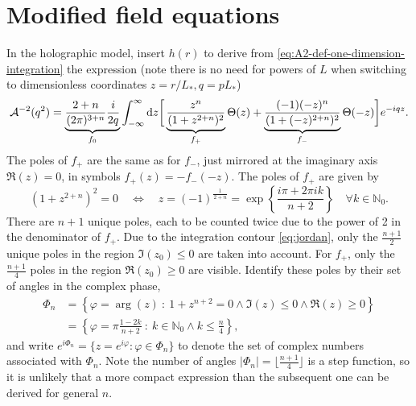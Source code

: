 \documentclass[12pt,a4paper]{report}
\numberwithin{equation}{chapter}
\begin{document}
\section{Modified field equations}\label{sec:modified-einstein}
In the holographic model, insert $h(r)$ to derive from \eqref{eq:A2-def-one-dimension-integration} the expression (note there is no need for powers of $L$ when switching to dimensionless coordinates $z=r/L_*,q=pL_*$)
\begin{equation}\label{eq:A2-holo-def}
{\cal A}^{-2}(q^2) =
\underbrace{\frac{2+n}{(2\pi)^{3+n}} \frac{i}{2q}}_{f_0}
\int_{-\infty}^\infty
\mathrm{d} z
\bigg[
\underbrace{\frac{z^n}{(1+z^{2+n})^2}}_{f_+} \Theta(z)
+
\underbrace{\frac{(-1)(-z)^n}{(1 + (-z)^{2+n})^2}}_{f_-} \Theta(-z)
\bigg]
e^{-i q z}.
\end{equation}
The poles of $f_+$ are the same as for $f_-$, just mirrored at the
imaginary axis $\Re(z)=0$, in symbols $f_+(z)=-f_-(-z)$. The poles of $f_+$ are given by
\begin{equation}
\left( 1 + z^{2+n} \right)^2 = 0
\quad\Leftrightarrow\quad
z = (-1)^{\frac 1{2+n}}
= \exp \left\{ \frac{i\pi + 2\pi ik}{n+2} \right\}
\quad\forall k\in \mathbb{N}_0.
\end{equation}
There are $n+1$ unique poles, each to be counted twice due to the power of 2 in the denominator of $f_+$.
Due to the integration contour \eqref{eq:jordan}, only the $\frac{n+1}{2}$ unique poles in the region
$\Im(z_0)\leq 0$ are taken into account. For $f_+$, only the $\frac{n+1}{4}$ poles in the region $\Re(z_0) \geq 0$ are
visible. Identify these poles by their set of angles in the complex phase,
\begin{align}
\Phi_n &= \left\{ \varphi=\arg(z)~:~1 + z^{n+2}=0 \wedge \Im(z) \leq 0 \wedge \Re(z) \geq 0 \right\}
\\
\label{eq:Phi}
&= \left\{ \varphi=\pi \frac{1 - 2k}{n+2}~:~k \in \mathbb{N}_0 \wedge k \leq \frac{n}{4}  \right\},
\end{align}
and write $e^{i\Phi_n}=\{ z = e^{i\varphi} : \varphi \in \Phi_n\}$ to denote the set of
complex numbers associated with $\Phi_n$.
Note the number of angles $|\Phi_n|=\lfloor \frac{n+1}{4} \rfloor$ is a step function, so it is unlikely that a more compact expression than the subsequent one can be derived for general $n$.
\end{document}
